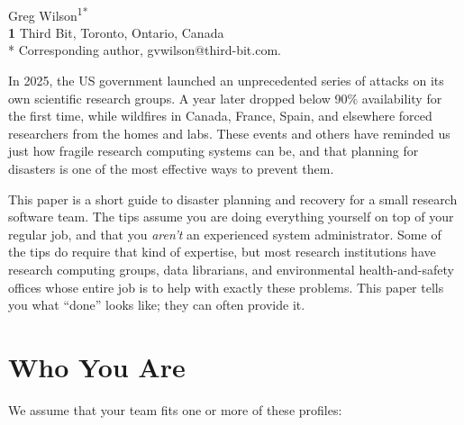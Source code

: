 \documentclass[10pt,letterpaper]{article}
\begin{document}
\vspace*{0.2in}

\begin{flushleft}
  {\Large
    \textbf{}
  }
  \newline
  \\
  {Greg Wilson}\textsuperscript{1*}
  \\
  \bigskip
  \textbf{1} Third Bit, Toronto, Ontario, Canada\\
  * Corresponding author, gvwilson@third-bit.com.
\end{flushleft}

In 2025, the US government launched an unprecedented series of attacks on its
own scientific research groups.  A year later 
dropped below 90\% availability for the first time, while wildfires in Canada,
France, Spain, and elsewhere forced researchers from the homes and labs.  These
events and others have reminded us just how fragile research computing systems
can be, and that planning for disasters is one of the most effective ways to
prevent them.

This paper is a short guide to disaster planning and recovery for a small
research software team.  The tips assume you are doing everything yourself on
top of your regular job, and that you \emph{aren't} an experienced system
administrator. Some of the tips do require that kind of expertise, but most
research institutions have research computing groups, data librarians, and
environmental health-and-safety offices whose entire job is to help with exactly
these problems. This paper tells you what ``done'' looks like; they can often
provide it.

\section*{Who You Are}

We assume that your team fits one or more of these profiles:
\end{document}
